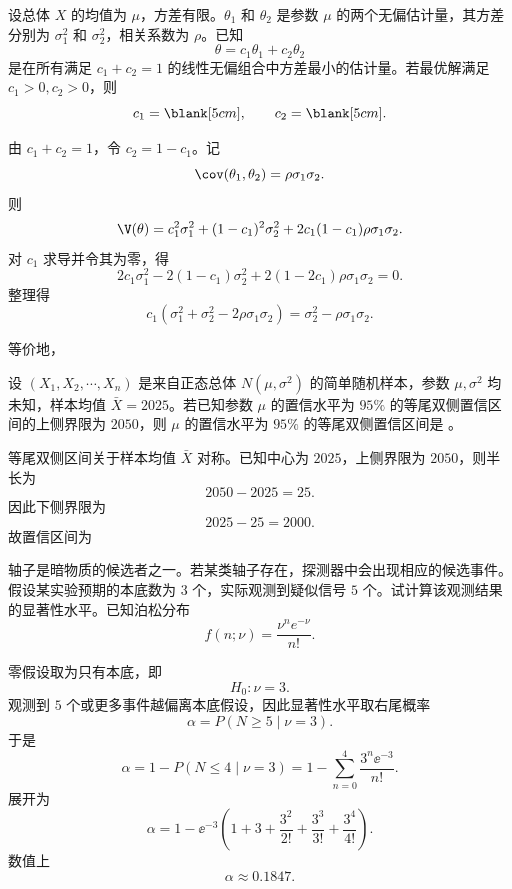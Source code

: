 \begin{question}
设总体 $X$ 的均值为 $\mu$，方差有限。$\theta_1$ 和 $\theta_2$ 是参数 $\mu$ 的两个无偏估计量，其方差分别为 $\sigma_1^2$ 和 $\sigma_2^2$，相关系数为 $\rho$。已知
\[
\theta=c_1\theta_1+c_2\theta_2
\]
是在所有满足 $c_1+c_2=1$ 的线性无偏组合中方差最小的估计量。若最优解满足 $c_1>0,c_2>0$，则
\[
c_1=\blank[5cm],\qquad c_2=\blank[5cm].
\]
\begin{solution}
由 $c_1+c_2=1$，令 $c_2=1-c_1$。记
\[
\cov(\theta_1,\theta_2)=\rho\sigma_1\sigma_2.
\]
则
\[
\V(\theta)
=c_1^2\sigma_1^2+(1-c_1)^2\sigma_2^2
+2c_1(1-c_1)\rho\sigma_1\sigma_2.
\]
对 $c_1$ 求导并令其为零，得
\[
2c_1\sigma_1^2-2(1-c_1)\sigma_2^2
+2(1-2c_1)\rho\sigma_1\sigma_2=0.
\]
整理得
\[
c_1(\sigma_1^2+\sigma_2^2-2\rho\sigma_1\sigma_2)
=\sigma_2^2-\rho\sigma_1\sigma_2.
\]

等价地，
\end{solution}
\end{question}

\begin{question}
设 $(X_1,X_2,\cdots,X_n)$ 是来自正态总体 $N(\mu,\sigma^2)$ 的简单随机样本，参数 $\mu,\sigma^2$ 均未知，样本均值 $\bar X=2025$。若已知参数 $\mu$ 的置信水平为 $95\%$ 的等尾双侧置信区间的上侧界限为 $2050$，则 $\mu$ 的置信水平为 $95\%$ 的等尾双侧置信区间是 \blank[4cm]。
\begin{solution}
等尾双侧区间关于样本均值 $\bar X$ 对称。已知中心为 $2025$，上侧界限为 $2050$，则半长为
\[
2050-2025=25.
\]
因此下侧界限为
\[
2025-25=2000.
\]
故置信区间为
\ansmath{[2000,2050]}
\end{solution}
\end{question}

\begin{question}
轴子是暗物质的候选者之一。若某类轴子存在，探测器中会出现相应的候选事件。假设某实验预期的本底数为 $3$ 个，实际观测到疑似信号 $5$ 个。试计算该观测结果的显著性水平。已知泊松分布
\[
f(n;\nu)=\frac{\nu^n e^{-\nu}}{n!}.
\]
\begin{solution}
零假设取为只有本底，即
\[
H_0:\nu=3.
\]
观测到 $5$ 个或更多事件越偏离本底假设，因此显著性水平取右尾概率
\[
\alpha=P(N\ge 5\mid \nu=3).
\]
于是
\[
\alpha=1-P(N\le 4\mid \nu=3)
=1-\sum_{n=0}^4\frac{3^n\ee^{-3}}{n!}.
\]
展开为
\[
\alpha=1-\ee^{-3}\left(1+3+\frac{3^2}{2!}+\frac{3^3}{3!}+\frac{3^4}{4!}\right).
\]
数值上
\[
\alpha\approx 0.1847.
\]

\end{solution}
\end{question}

